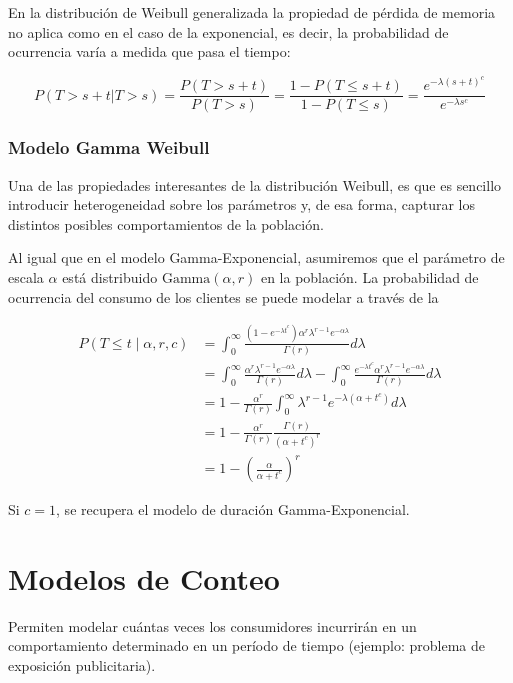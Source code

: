 \documentclass[
]{book}
\begin{document}
\FloatBarrier

En la distribución de Weibull generalizada la propiedad de pérdida de
memoria no aplica como en el caso de la exponencial, es decir, la
probabilidad de ocurrencia varía a medida que pasa el tiempo:

\[P(T > s + t|T>s) = \frac{P(T> s+t)}{P(T> s)} = \frac{1-P(T \leq s+t)}{1-P(T \leq s)}= \frac{e^{-\lambda(s+t)^c}}{e^{-\lambda s^c}} \]

\subsubsection*{Modelo Gamma Weibull}\label{modelo-gamma-weibull}

Una de las propiedades interesantes de la distribución Weibull, es que
es sencillo introducir heterogeneidad sobre los parámetros y, de esa
forma, capturar los distintos posibles comportamientos de la población.

Al igual que en el modelo Gamma-Exponencial, asumiremos que el parámetro
de escala \(\alpha\) está distribuido \(\text{Gamma}(\alpha,r)\) en la
población. La probabilidad de ocurrencia del consumo de los clientes se
puede modelar a través de la

\[
\begin{aligned} P(T \leq t \mid \alpha,r, c) &= \int_{0}^{\infty} \frac{(1 - e^{-\lambda t^c}) \alpha^r \lambda^{r-1}e^{-\alpha \lambda}}{\Gamma(r)} d\lambda \\ &= \int_{0}^{\infty} \frac{\alpha^r \lambda^{r-1}e^{-\alpha \lambda}}{\Gamma(r)} d\lambda - \int_{0}^{\infty} \frac{e^{-\lambda t^c} \alpha^r \lambda^{r-1}e^{-\alpha \lambda}}{\Gamma(r)} d\lambda \\ &= 1 - \frac{\alpha^r}{\Gamma(r)} \int_{0}^{\infty} \lambda^{r-1}e^{-\lambda(\alpha + t^c)} d\lambda \\ &= 1 - \frac{\alpha^r}{\Gamma(r)} \frac{\Gamma(r)}{(\alpha + t^c)^r} \\ &= 1 - \left(\frac{\alpha}{\alpha + t^c}\right)^r \end{aligned}
\]

Si \(c=1\), se recupera el modelo de duración Gamma-Exponencial.

\section{Modelos de Conteo}\label{modelos-de-conteo}

Permiten modelar cuántas veces los consumidores incurrirán en un
comportamiento determinado en un período de tiempo (ejemplo: problema de
exposición publicitaria).
\end{document}
